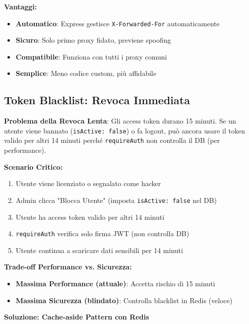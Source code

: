 \documentclass[11pt,a4paper]{article}
\newcommand{\code}[1]{\texttt{#1}}
\newcommand{\important}[1]{\textcolor{red!80!black}{\textbf{#1}}}
\begin{document}
\textbf{Vantaggi:}
\begin{itemize}
    \item \textbf{Automatico}: Express gestisce \code{X-Forwarded-For} automaticamente
    \item \textbf{Sicuro}: Solo primo proxy fidato, previene spoofing
    \item \textbf{Compatibile}: Funziona con tutti i proxy comuni
    \item \textbf{Semplice}: Meno codice custom, più affidabile
\end{itemize}

\subsection{Token Blacklist: Revoca Immediata}

\important{Problema della Revoca Lenta}: Gli access token durano 15 minuti. Se un utente viene bannato (\code{isActive: false}) o fa logout, può ancora usare il token valido per altri 14 minuti perché \code{requireAuth} non controlla il DB (per performance).

\textbf{Scenario Critico:}
\begin{enumerate}
    \item Utente viene licenziato o segnalato come hacker
    \item Admin clicca "Blocca Utente" (imposta \code{isActive: false} nel DB)
    \item Utente ha access token valido per altri 14 minuti
    \item \code{requireAuth} verifica solo firma JWT (non controlla DB)
    \item Utente continua a scaricare dati sensibili per 14 minuti
\end{enumerate}

\textbf{Trade-off Performance vs. Sicurezza:}
\begin{itemize}
    \item \textbf{Massima Performance (attuale)}: Accetta rischio di 15 minuti
    \item \textbf{Massima Sicurezza (blindato)}: Controlla blacklist in Redis (veloce)
\end{itemize}

\textbf{Soluzione: Cache-aside Pattern con Redis}
\end{document}
